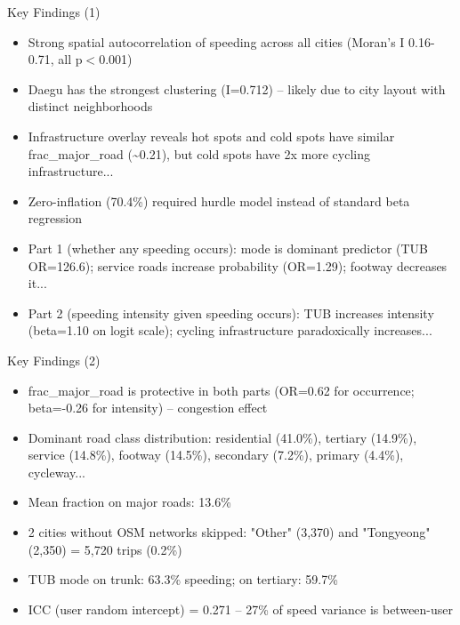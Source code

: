 \documentclass[aspectratio=169, 10pt]{beamer}
\begin{document}
\begin{frame}{Key Findings (1)}
\begin{itemize}\small
  \item Strong spatial autocorrelation of speeding across all cities (Moran's I 0.16-0.71, all p$<$0.001)
  \item Daegu has the strongest clustering (I=0.712) -- likely due to city layout with distinct neighborhoods
  \item Infrastructure overlay reveals hot spots and cold spots have similar frac\_major\_road (\textasciitilde{}0.21), but cold spots have 2x more cycling infrastructure...
  \item Zero-inflation (70.4\%) required hurdle model instead of standard beta regression
  \item Part 1 (whether any speeding occurs): mode is dominant predictor (TUB OR=126.6); service roads increase probability (OR=1.29); footway decreases it...
  \item Part 2 (speeding intensity given speeding occurs): TUB increases intensity (beta=1.10 on logit scale); cycling infrastructure paradoxically increases...
\end{itemize}
\end{frame}

\begin{frame}{Key Findings (2)}
\begin{itemize}\small
  \item frac\_major\_road is protective in both parts (OR=0.62 for occurrence; beta=-0.26 for intensity) -- congestion effect
  \item Dominant road class distribution: residential (41.0\%), tertiary (14.9\%), service (14.8\%), footway (14.5\%), secondary (7.2\%), primary (4.4\%), cycleway...
  \item Mean fraction on major roads: 13.6\%
  \item 2 cities without OSM networks skipped: "Other" (3,370) and "Tongyeong" (2,350) = 5,720 trips (0.2\%)
  \item TUB mode on trunk: 63.3\% speeding; on tertiary: 59.7\%
  \item ICC (user random intercept) = 0.271 -- 27\% of speed variance is between-user
\end{itemize}
\end{frame}
\end{document}
